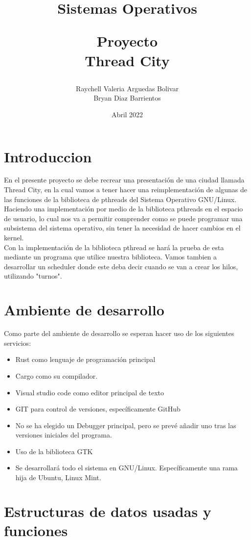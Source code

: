 \documentclass{article}
\title{Sistemas Operativos


Proyecto \\ Thread City

}
\author{Raychell Valeria Arguedas Bolivar\\
Bryan Diaz Barrientos}
\date{Abril 2022}
\begin{document}
\maketitle
  \newpage
  
\section{Introduccion}

En el presente proyecto se debe recrear una presentación de una ciudad llamada Thread City, en la cual vamos a tener hacer una reimplementación de algunas de las funciones de la biblioteca de pthreads del Sistema Operativo GNU/Linux. Haciendo una implementación por medio de la biblioteca pthreads en el espacio de usuario, lo cual nos va a permitir comprender como se puede programar una subsistema del sistema operativo, sin tener la necesidad de hacer cambios en el kernel.\\
Con la implementación de la biblioteca pthread se hará la prueba de esta mediante un programa que utilice nuestra biblioteca.
Vamos tambien a desarrollar un scheduler donde este deba decir cuando se van a crear los hilos, utilizando "turnos".


\newpage


\section{Ambiente de desarrollo}
Como parte del ambiente de desarrollo se esperan hacer uso de los siguientes servicios: \\

\begin{itemize}
\item Rust como lenguaje de programación principal
\item Cargo como su compilador.
\item Visual studio code como editor principal de texto
\item GIT para control de versiones, específicamente GitHub
\item No se ha elegido un Debugger principal, pero se prevé añadir uno tras las versiones iniciales del programa.
\item Uso de la biblioteca GTK
\item Se desarrollará todo el sistema en GNU/Linux. Específicamente una rama hija de Ubuntu, Linux Mint.
\end{itemize}


\newpage
\section{Estructuras de datos usadas y funciones}
\end{document}
